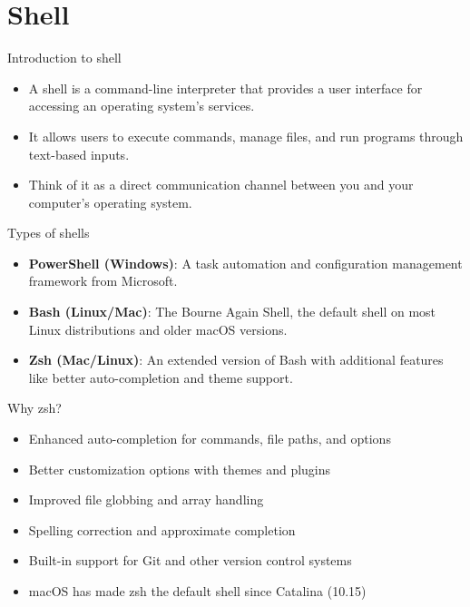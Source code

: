 \section{Shell}

\begin{frame}[fragile]{Introduction to shell}
	\begin{itemize}
		\item A shell is a command-line interpreter that provides a user interface for accessing an operating system's services.
		\item It allows users to execute commands, manage files, and run programs through text-based inputs.
		\item Think of it as a direct communication channel between you and your computer's operating system.
	\end{itemize}
\end{frame}

\begin{frame}[fragile]{Types of shells}
	\begin{itemize}
		\item \textbf{PowerShell (Windows)}: A task automation and configuration management framework from Microsoft.
		\item \textbf{Bash (Linux/Mac)}: The Bourne Again Shell, the default shell on most Linux distributions and older macOS versions.
		\item \textbf{Zsh (Mac/Linux)}: An extended version of Bash with additional features like better auto-completion and theme support.
	\end{itemize}
\end{frame}

\begin{frame}[fragile]{Why zsh?}
	\begin{itemize}
		\item Enhanced auto-completion for commands, file paths, and options
		\item Better customization options with themes and plugins
		\item Improved file globbing and array handling
		\item Spelling correction and approximate completion
		\item Built-in support for Git and other version control systems
		\item macOS has made zsh the default shell since Catalina (10.15)
	\end{itemize}
\end{frame}

